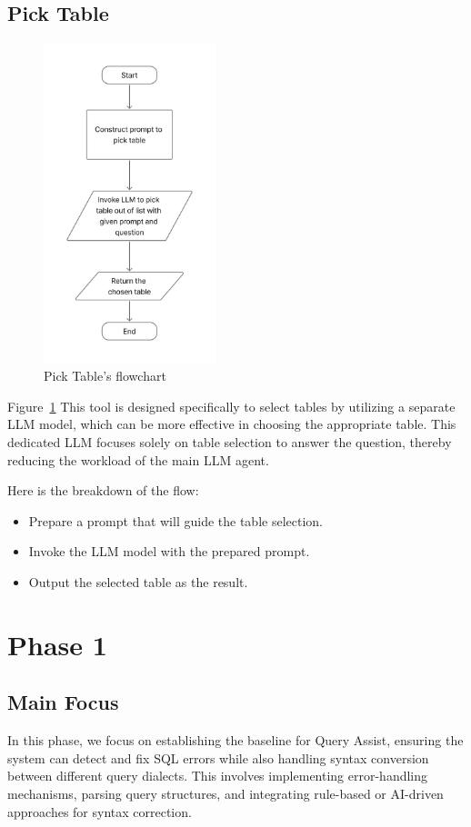     \subsection{Pick Table}
    \label{sec:pick_table}
    \begin{figure}[H]
        \centering
        \includegraphics[width=5cm]{chapters/3/figures/pick_table.jpg}
        \caption[Pick Table tool’s flowchart]{Pick Table’s flowchart}
        \label{fig:pick_table}
    \end{figure}
    Figure~\ref{fig:pick_table} This tool is designed specifically to select tables by utilizing a separate LLM model, which can be more effective in choosing the appropriate table. This dedicated LLM focuses solely on table selection to answer the question, thereby reducing the workload of the main LLM agent.

    Here is the breakdown of the flow:
    \begin{itemize}
        \item  Prepare a prompt that will guide the table selection.
        \item  Invoke the LLM model with the prepared prompt.
        \item  Output the selected table as the result.
    \end{itemize}

\section{Phase 1}
    \subsection{Main Focus}
    In this phase, we focus on establishing the baseline for Query Assist, ensuring the system can detect and fix SQL errors while also handling syntax conversion between different query dialects. This involves implementing error-handling mechanisms, parsing query structures, and integrating rule-based or AI-driven approaches for syntax correction.

